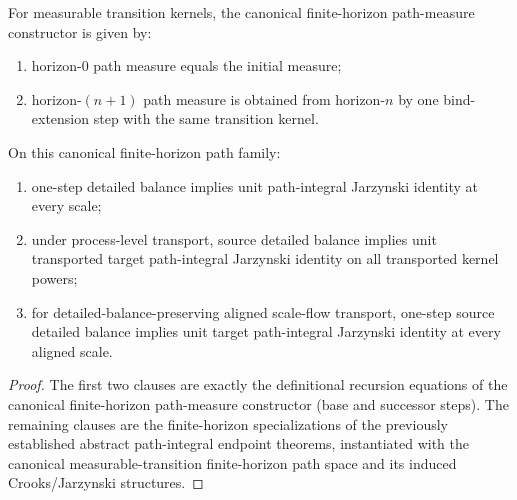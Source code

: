 \begin{theorem}\label{thm:measurable-transition-finite-horizon-canonical-endpoint}
For measurable transition kernels, the canonical finite-horizon path-measure constructor is given by:
\begin{enumerate}
\item horizon-$0$ path measure equals the initial measure;
\item horizon-$(n+1)$ path measure is obtained from horizon-$n$ by one bind-extension step with the same transition kernel.
\end{enumerate}

On this canonical finite-horizon path family:
\begin{enumerate}
\item one-step detailed balance implies unit path-integral Jarzynski identity at every scale;
\item under process-level transport, source detailed balance implies unit transported target path-integral Jarzynski identity on all transported kernel powers;
\item for detailed-balance-preserving aligned scale-flow transport, one-step source detailed balance implies unit target path-integral Jarzynski identity at every aligned scale.
\end{enumerate}
\end{theorem}

\begin{proof}
The first two clauses are exactly the definitional recursion equations of the canonical finite-horizon path-measure constructor (base and successor steps). The remaining clauses are the finite-horizon specializations of the previously established abstract path-integral endpoint theorems, instantiated with the canonical measurable-transition finite-horizon path space and its induced Crooks/Jarzynski structures.
\end{proof}

